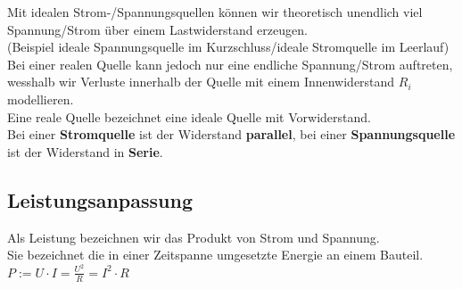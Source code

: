 					\iend


					Mit idealen Strom-/Spannungsquellen können wir theoretisch unendlich viel Spannung/Strom über einem Lastwiderstand erzeugen. \\
					(Beispiel ideale Spannungsquelle im Kurzschluss/ideale Stromquelle im Leerlauf) \\
					Bei einer realen Quelle kann jedoch nur eine endliche Spannung/Strom auftreten, wesshalb wir Verluste innerhalb der Quelle mit einem Innenwiderstand $R_i$ modellieren. \\

					\beginip
					Eine reale Quelle bezeichnet eine ideale Quelle mit Vorwiderstand. \\
					Bei einer \textbf{Stromquelle} ist der Widerstand \textbf{parallel}, bei einer \textbf{Spannungsquelle} ist der Widerstand in \textbf{Serie}.
						\begin{center}
							\fix
						\end{center}
					\iend


					\subsection{Leistungsanpassung}
					\beginip
						Als Leistung bezeichnen wir das Produkt von Strom und Spannung. \\
						Sie bezeichnet die in einer Zeitspanne umgesetzte Energie an einem Bauteil. \\
						\formulaBegin
						$\displaystyle P := U \cdot I = \frac{U^2}{R} = I^2 \cdot R $
						\formulaEnd
					\iend

